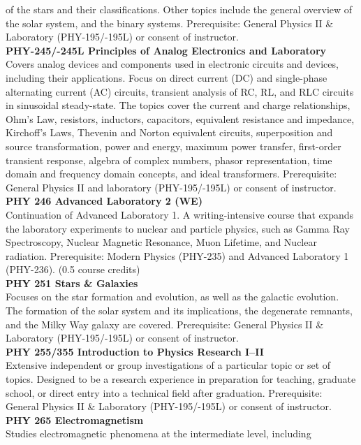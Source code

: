 \documentclass[
  letterpaper,
]{scrbook}
\begin{document}
of the stars and their classifications. Other topics include the general
overview of the solar system, and the binary systems. Prerequisite:
General Physics II \& Laboratory (PHY-195/-195L) or consent of
instructor.\\
\textbf{PHY-245/-245L Principles of Analog Electronics and Laboratory}\\
Covers analog devices and components used in electronic circuits and
devices, including their applications. Focus on direct current (DC) and
single-phase alternating current (AC) circuits, transient analysis of
RC, RL, and RLC circuits in sinusoidal steady-state. The topics cover
the current and charge relationships, Ohm's Law, resistors, inductors,
capacitors, equivalent resistance and impedance, Kirchoff's Laws,
Thevenin and Norton equivalent circuits, superposition and source
transformation, power and energy, maximum power transfer, first-order
transient response, algebra of complex numbers, phasor representation,
time domain and frequency domain concepts, and ideal transformers.
Prerequisite: General Physics II and laboratory (PHY-195/-195L) or
consent of instructor.\\
\textbf{PHY 246 Advanced Laboratory 2 (WE)}\\
Continuation of Advanced Laboratory 1. A writing-intensive course that
expands the laboratory experiments to nuclear and particle physics, such
as Gamma Ray Spectroscopy, Nuclear Magnetic Resonance, Muon Lifetime,
and Nuclear radiation. Prerequisite: Modern Physics (PHY-235) and
Advanced Laboratory 1 (PHY-236). (0.5 course credits)\\
\textbf{PHY 251 Stars \& Galaxies}\\
Focuses on the star formation and evolution, as well as the galactic
evolution. The formation of the solar system and its implications, the
degenerate remnants, and the Milky Way galaxy are covered. Prerequisite:
General Physics II \& Laboratory (PHY-195/-195L) or consent of
instructor.\\
\textbf{PHY 255/355 Introduction to Physics Research I--II}\\
Extensive independent or group investigations of a particular topic or
set of topics. Designed to be a research experience in preparation for
teaching, graduate school, or direct entry into a technical field after
graduation. Prerequisite: General Physics II \& Laboratory
(PHY-195/-195L) or consent of instructor.\\
\textbf{PHY 265 Electromagnetism}\\
Studies electromagnetic phenomena at the intermediate level, including
\end{document}
